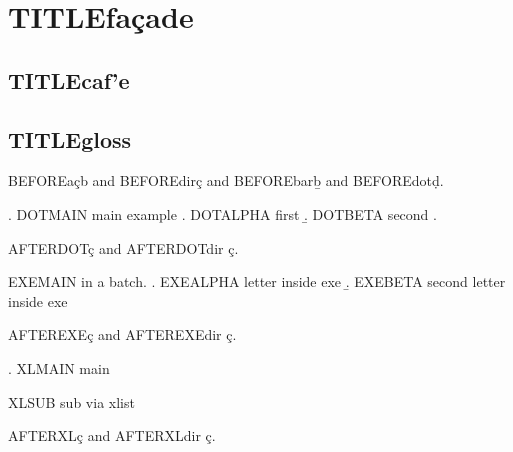 
\usepackage{hyperref}

\section{TITLEfa\c cade}
\subsection{TITLEcaf\a'e}
\subsection{TITLEgloss }

BEFOREa\c cb and BEFOREdir\c{c} and BEFOREbar\b{b} and BEFOREdot\d{d}.

\ex. DOTMAIN main example
\a. DOTALPHA first
\b. DOTBETA second
\z.

AFTERDOT\c{c} and AFTERDOTdir ç.

\begin{exe}
\ex EXEMAIN in a batch.
\a. EXEALPHA letter inside exe
\b. EXEBETA second letter inside exe
\end{exe}

AFTEREXE\c{c} and AFTEREXEdir ç.

\ex. XLMAIN main
\begin{xlist}
\ex XLSUB sub via xlist
\end{xlist}

AFTERXL\c{c} and AFTERXLdir ç.

